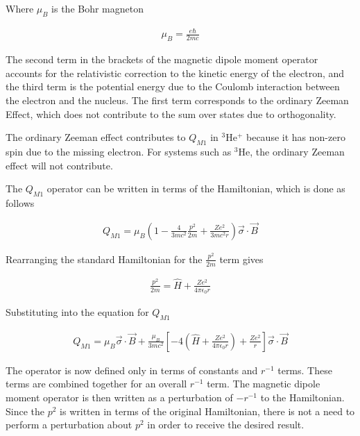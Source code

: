             \noindent Where $\mu_B$ is the Bohr magneton
            
            \begin{align}
                \mu_B = \frac{e \hbar}{2mc}
            \end{align}

            \noindent The second term in the brackets of the magnetic dipole moment operator accounts for the relativistic correction to the kinetic energy of the electron, and the third term is the potential energy due to the Coulomb interaction between the electron and the nucleus. The first term corresponds to the ordinary Zeeman Effect, which does not contribute to the sum over states due to orthogonality.

            The ordinary Zeeman effect contributes to $Q_{M1}$ in $^3$He$^+$ because it has non-zero spin due to the missing electron. For systems such as $^3$He, the ordinary Zeeman effect will not contribute.

            The $Q_{M1}$ operator can be written in terms of the Hamiltonian, which is done as follows

            \begin{align}
                Q_{M1} = \mu_B \left(1 - \frac{4}{3mc^2} \frac{p^2}{2m} + \frac{Ze^2}{3mc^2r} \right) \vec{\sigma} \cdot \vec{B}
            \end{align}

            \noindent Rearranging the standard Hamiltonian for the $\frac{p^2}{2m}$ term gives

            \begin{align}
                \frac{p^2}{2m} = \hat{H} + \frac{Ze^2}{4\pi \epsilon_0 r}
            \end{align}

            \noindent Substituting into the equation for $Q_{M1}$

            \begin{align}
                Q_{M1} = \mu_B \vec{\sigma} \cdot \vec{B} + \frac{\mu_B}{3mc^2} \left[-4\left(\hat{H} + \frac{Ze^2}{4\pi \epsilon_0 r} \right) + \frac{Ze^2}{r} \right] \vec{\sigma} \cdot \vec{B}
            \end{align}

            The operator is now defined only in terms of constants and $r^{-1}$ terms. These terms are combined together for an overall $r^{-1}$ term. The magnetic dipole moment operator is then written as a perturbation of $-r^{-1}$ to the Hamiltonian. Since the $p^2$ is written in terms of the original Hamiltonian, there is not a need to perform a perturbation about $p^2$ in order to receive the desired result.

